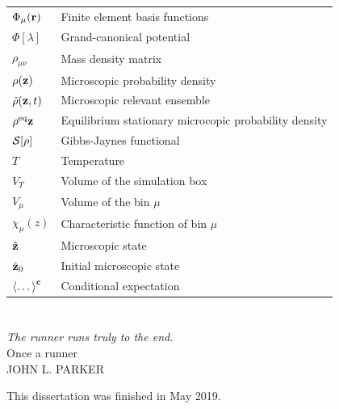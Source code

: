 \documentclass[b5paper,openright,10pt]{book}
\begin{document}
\begin{appendices}
\begin{tabular}{l l}
    $\Phi_{\mu}({\bf r})$ & Finite element basis functions \\
    $\Phi[\lambda]$ & Grand-canonical potential \\
    $\rho_{\mu\nu}$ & Mass density matrix \\
    $\rho({\bf z})$ & Microscopic probability density \\
    $\bar{\rho}({\bf z}, t)$ & Microscopic relevant ensemble \\
    $\rho^{\rm eq}{{\bf z}}$ & Equilibrium stationary microcopic probability density\\
    ${\cal S}[\rho]$ & Gibbs-Jaynes functional \\
    $T$ & Temperature \\
    $V_T$ & Volume of the simulation box \\
    $V_{\mu}$ & Volume of the bin $\mu$ \\
    $\chi_{\mu}(z)$ & Characteristic function of bin $\mu$ \\
    $\hat{{\bf z}}$  & Microscopic state \\
    $\hat{{\bf z}}_0$  & Initial microscopic state \\
    $\left<\dots\right>^{\bf c}$ & Conditional expectation \\
  \end{tabular}


\end{appendices}

\cleardoublepage
\pagestyle{Contents}
\listoffigures %

\cleardoublepage
{} %
\listoftables %

%
%

\newpage
\chapter*{} %
\pagestyle{noHeader}  %

\begin{center}
\textit{The runner runs truly to the end.} \\Once a runner \\ JOHN L. PARKER
\end{center}
\vspace{80pt}
\begin{center}
This dissertation was finished in May 2019. 
\end{center}
\end{document}
